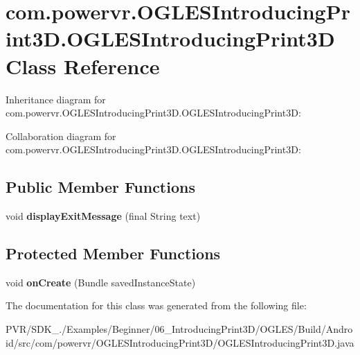 \hypertarget{classcom_1_1powervr_1_1_o_g_l_e_s_introducing_print3_d_1_1_o_g_l_e_s_introducing_print3_d}{\section{com.\+powervr.\+O\+G\+L\+E\+S\+Introducing\+Print3\+D.\+O\+G\+L\+E\+S\+Introducing\+Print3\+D Class Reference}
\label{classcom_1_1powervr_1_1_o_g_l_e_s_introducing_print3_d_1_1_o_g_l_e_s_introducing_print3_d}
}


Inheritance diagram for com.\+powervr.\+O\+G\+L\+E\+S\+Introducing\+Print3\+D.\+O\+G\+L\+E\+S\+Introducing\+Print3\+D\+:


Collaboration diagram for com.\+powervr.\+O\+G\+L\+E\+S\+Introducing\+Print3\+D.\+O\+G\+L\+E\+S\+Introducing\+Print3\+D\+:
\subsection*{Public Member Functions}
\begin{DoxyCompactItemize}
\item 
\hypertarget{classcom_1_1powervr_1_1_o_g_l_e_s_introducing_print3_d_1_1_o_g_l_e_s_introducing_print3_d_a78f811e7e19e12f99ffb30348679e34e}{void {\bfseries display\+Exit\+Message} (final String text)}\label{classcom_1_1powervr_1_1_o_g_l_e_s_introducing_print3_d_1_1_o_g_l_e_s_introducing_print3_d_a78f811e7e19e12f99ffb30348679e34e}

\end{DoxyCompactItemize}
\subsection*{Protected Member Functions}
\begin{DoxyCompactItemize}
\item 
\hypertarget{classcom_1_1powervr_1_1_o_g_l_e_s_introducing_print3_d_1_1_o_g_l_e_s_introducing_print3_d_a3f6a93ec6e56d994abddf3df980ba491}{void {\bfseries on\+Create} (Bundle saved\+Instance\+State)}\label{classcom_1_1powervr_1_1_o_g_l_e_s_introducing_print3_d_1_1_o_g_l_e_s_introducing_print3_d_a3f6a93ec6e56d994abddf3df980ba491}

\end{DoxyCompactItemize}


The documentation for this class was generated from the following file\+:\begin{DoxyCompactItemize}
\item 
P\+V\+R/\+S\+D\+K\+\_./\+Examples/\+Beginner/06\+\_\+\+Introducing\+Print3\+D/\+O\+G\+L\+E\+S/\+Build/\+Android/src/com/powervr/\+O\+G\+L\+E\+S\+Introducing\+Print3\+D/O\+G\+L\+E\+S\+Introducing\+Print3\+D.\+java\end{DoxyCompactItemize}
